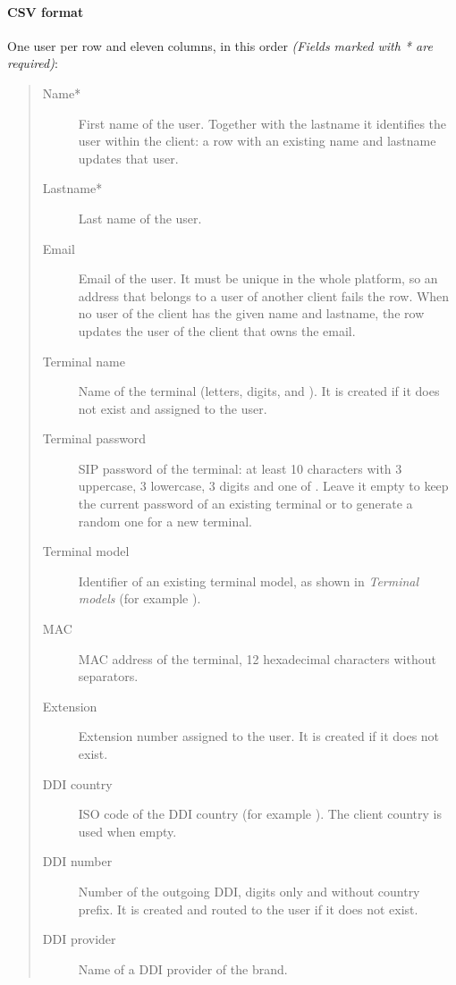 \documentclass[letterpaper,10pt,english]{sphinxmanual}
\begin{document}
\paragraph{CSV format}
\label{administration_portal/brand/clients/virtual_pbx:csv-format}
One user per row and eleven columns, in this order \emph{(Fields marked with * are required)}:
\begin{quote}
\begin{description}
\item[{Name*}] \leavevmode
First name of the user. Together with the lastname it identifies the user
within the client: a row with an existing name and lastname updates that user.

\item[{Lastname*}] \leavevmode
Last name of the user.

\item[{Email}] \leavevmode
Email of the user. It must be unique in the whole platform, so an address
that belongs to a user of another client fails the row. When no user of the
client has the given name and lastname, the row updates the user of the
client that owns the email.

\item[{Terminal name}] \leavevmode
Name of the terminal (letters, digits, \sphinxcode{\_} and \sphinxcode{*}). It is created if it
does not exist and assigned to the user.

\item[{Terminal password}] \leavevmode
SIP password of the terminal: at least 10 characters with 3 uppercase, 3
lowercase, 3 digits and one of \sphinxcode{+ * \_ -}. Leave it empty to keep the current
password of an existing terminal or to generate a random one for a new terminal.

\item[{Terminal model}] \leavevmode
Identifier of an existing terminal model, as shown in \emph{Terminal models}
(for example ).

\item[{MAC}] \leavevmode
MAC address of the terminal, 12 hexadecimal characters without separators.

\item[{Extension}] \leavevmode
Extension number assigned to the user. It is created if it does not exist.

\item[{DDI country}] \leavevmode
ISO code of the DDI country (for example ). The client country is used
when empty.

\item[{DDI number}] \leavevmode
Number of the outgoing DDI, digits only and without country prefix. It is
created and routed to the user if it does not exist.

\item[{DDI provider}] \leavevmode
Name of a DDI provider of the brand.

\end{description}
\end{quote}
\end{document}
